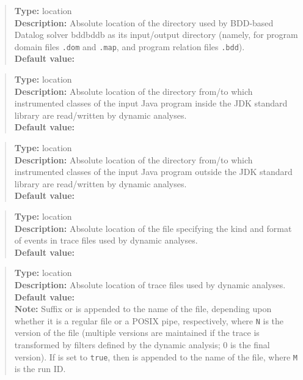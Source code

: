 \begin{quote}
{\bf Type:} location \\
{\bf Description:} Absolute location of the directory used by BDD-based Datalog solver bddbddb as its input/output directory (namely, for program domain files {\tt *.dom} and {\tt *.map}, and program relation files {\tt *.bdd}). \\
{\bf Default value:} 
\end{quote}

\begin{quote}
{\bf Type:} location \\
{\bf Description:} Absolute location of the directory from/to which instrumented classes of the input Java program inside the JDK standard library are read/written by dynamic analyses. \\
{\bf Default value:} 
\end{quote}

\begin{quote}
{\bf Type:} location  \\
{\bf Description:} Absolute location of the directory from/to which instrumented classes of the input Java program outside the JDK standard library are read/written by dynamic analyses. \\
{\bf Default value:} 
\end{quote}

\begin{quote}
{\bf Type:} location \\
{\bf Description:} Absolute location of the file specifying the kind and format of events in trace files used by dynamic analyses. \\
{\bf Default value:} 
\end{quote}

\begin{quote}
{\bf Type:} location  \\
{\bf Description:} Absolute location of trace files used by dynamic analyses. \\
{\bf Default value:}  \\
{\bf Note:} Suffix  or  is appended to the name of the file, depending upon whether it is a regular file or a POSIX pipe, respectively, where {\tt N} is the version of the file (multiple versions are maintained if the trace is transformed by filters defined by the dynamic analysis; 0 is the final version).  If  is set to {\tt true}, then  is appended to the name of the file, where {\tt M} is the run ID. 
\end{quote}

